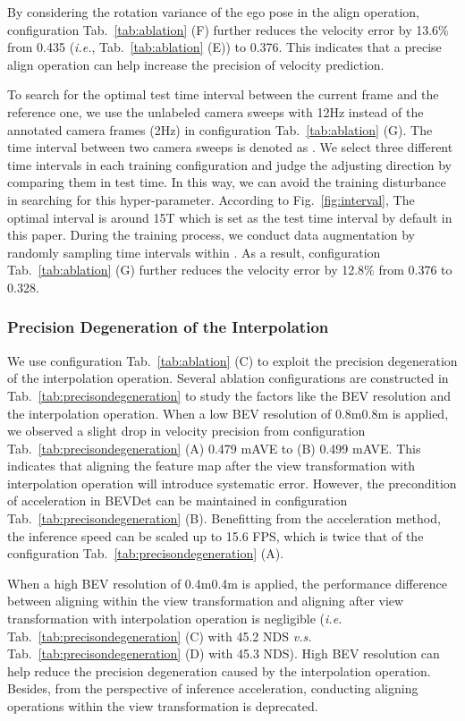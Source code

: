 \documentclass[10pt,twocolumn,letterpaper]{article}
\begin{document}
By considering the rotation variance of the ego pose in the align operation, configuration Tab.~\ref{tab:ablation} (F) further reduces the velocity error by 13.6\% from 0.435 (\textit{i.e.}, Tab.~\ref{tab:ablation} (E)) to 0.376. This indicates that a precise align operation can help increase the precision of velocity prediction.

To search for the optimal test time interval between the current frame and the reference one, we use the unlabeled camera sweeps with 12Hz instead of the annotated camera frames (2Hz) in configuration Tab.~\ref{tab:ablation} (G). The time interval between two camera sweeps is denoted as . We select three different time intervals in each training configuration and judge the adjusting direction by comparing them in test time. In this way, we can avoid the training disturbance in searching for this hyper-parameter. According to Fig.~\ref{fig:interval}, The optimal interval is around 15T which is set as the test time interval by default in this paper. During the training process, we conduct data augmentation by randomly sampling time intervals within . As a result, configuration Tab.~\ref{tab:ablation} (G) further reduces the velocity error by 12.8\% from 0.376 to 0.328.

\subsubsection{Precision Degeneration of the Interpolation}
\label{sec:precisondegeneration}
We use configuration Tab.~\ref{tab:ablation} (C) to exploit the precision degeneration of the interpolation operation. Several ablation configurations are constructed in Tab.~\ref{tab:precisondegeneration} to study the factors like the BEV resolution and the interpolation operation. When a low BEV resolution of 0.8m0.8m is applied, we observed a slight drop in velocity precision from configuration Tab.~\ref{tab:precisondegeneration} (A) 0.479 mAVE to (B) 0.499 mAVE. This indicates that aligning the feature map after the view transformation with interpolation operation will introduce systematic error. However, the precondition of acceleration in BEVDet \cite{BEVDet} can be maintained in configuration Tab.~\ref{tab:precisondegeneration} (B). Benefitting from the acceleration method, the inference speed can be scaled up to 15.6 FPS, which is twice that of the configuration Tab.~\ref{tab:precisondegeneration} (A).

When a high BEV resolution of 0.4m0.4m is applied, the performance difference between aligning within the view transformation and aligning after view transformation with interpolation operation is negligible (\textit{i.e.} Tab.~\ref{tab:precisondegeneration} (C) with 45.2 NDS \textit{v.s.} Tab.~\ref{tab:precisondegeneration} (D) with 45.3 NDS). High BEV resolution can help reduce the precision degeneration caused by the interpolation operation. Besides, from the perspective of inference acceleration, conducting aligning operations within the view transformation is deprecated.
\end{document}
